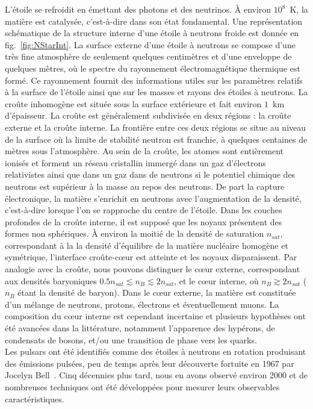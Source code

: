 L'étoile se refroidit en émettant des photons et des neutrinos. À environ 
$10^8$~K, la matière est catalysée, c'est-à-dire dans son état fondamental. 
Une représentation schématique de la structure interne d'une étoile à neutrons 
froide est donnée en fig.~\ref{fig:NStarInt}. 
La surface externe d'une étoile à neutrons se compose d'une très fine 
atmosphère de seulement quelques centimètres et d'une enveloppe de quelques 
mètres, où le spectre du rayonnement électromagnétique thermique est formé. Ce 
rayonnement fournit des informations utiles sur les paramètres relatifs à la 
surface de l'étoile ainsi que sur les masses et rayons des étoiles à neutrons. 
La croûte inhomogène est située sous la surface extérieure et fait 
environ $1$~km d'épaisseur. 
La croûte est généralement subdivisée en deux régions : la croûte externe et la 
croûte interne. La frontière entre ces deux régions se situe au niveau de
la surface où la limite de stabilité neutron est franchie, à quelques centaines 
de mètres sous l'atmosphère. 
Au sein de la croûte, les atomes sont entièrement ionisés et forment un réseau
cristallin immergé dans un gaz d'électrons relativistes ainsi que dans un gaz 
dans de neutrons si le potentiel chimique des neutrons est supérieur à la masse 
au repos des neutrons. 
De part la capture électronique, la matière s'enrichit en neutrons avec 
l'augmentation de la densité, c'est-à-dire lorsque l'on se rapproche du centre 
de l'étoile. 
Dans les couches profondes de la croûte interne, il est supposé que les noyaux 
présentent des formes non sphériques. 
%
À environ la moitié de la densité de saturation $n_{sat}$, correspondant à la 
la densité d'équilibre de la matière nucléaire homogène et symétrique, 
l'interface croûte-c\oe ur est atteinte et les noyaux disparaissent. 
Par analogie avec la croûte, nous pouvons distinguer le c\oe ur externe, 
correspondant aux densités baryoniques $0.5n_{sat} \lesssim n_B 
\lesssim 2n_{sat}$, et le c\oe ur interne, où $n_B \gtrsim 2n_{sat}$ ($n_B$
étant la densité de baryon). 
Dans le c\oe ur externe, la matière est constituée d'un mélange de neutrons, 
protons, électrons et éventuellement muons. La composition du c\oe ur interne 
est cependant incertaine et plusieurs hypothèses ont été avancées dans la
littérature, notamment l'apparence des hypérons, de condensats de bosons, et/ou 
une transition de phase vers les quarks. 
\\

Les pulsars ont été identifiés comme des étoiles à neutrons en rotation 
produisant des émissions pulsées, peu de temps après leur découverte fortuite 
en 1967 par Jocelyn Bell~\cite{Hewish1968}. Cinq décennies plus tard, nous en 
avons observé environ 2000 et de nombreuses techniques ont été développées pour 
mesurer leurs observables caractéristiques.

